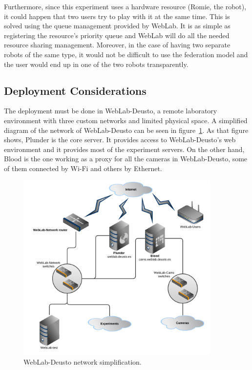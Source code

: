 Furthermore, since this experiment uses a hardware resource (Romie, the robot), it could happen that
two users try to play with it at the same time. This is solved using the queue management provided
by WebLab. It is as simple as registering the resource's priority queue and WebLab will do all the
needed resource sharing management. Moreover, in the case of having two separate robots of the same
type, it would not be difficult to use the federation model and the user would end up in one of the
two robots transparently.

\subsection{Deployment Considerations}

The deployment must be done in WebLab-Deusto, a remote laboratory environment with three custom
networks and limited physical space. A simplified diagram of the network of WebLab-Deusto can be
seen in figure~\ref{fig:weblab-network}. As that figure shows, Plunder is the core server. It
provides access to WebLab-Deusto's web environment and it provides most of the experiment servers.
On the other hand, Blood is the one working as a proxy for all the cameras in WebLab-Deusto, some of
them connected by Wi-Fi and others by Ethernet.

\begin{figure}[!htbp]
	\centering
	\includegraphics[width=0.9\textwidth]{fig/weblab-network}
	\caption{WebLab-Deusto network simplification.}\label{fig:weblab-network}
\end{figure}


